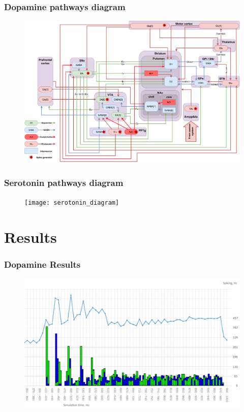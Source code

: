 \documentclass[12pt, aspectratio=169]{beamer}
\begin{document}

\begin{frame}
\frametitle{Dopamine pathways diagram}
\begin{figure}
\includegraphics[width=0.8\linewidth]{dopamine_diagram}
\end{figure}
\end{frame}


\begin{frame}
\frametitle{Serotonin pathways diagram}
\begin{figure}
\texttt{[image: serotonin\_diagram]}
\end{figure}
\end{frame}

\section{Results}

\begin{frame}
\frametitle{Dopamine Results}
\begin{figure}
\includegraphics[width=0.8\linewidth]{resultBIG_short}
\end{figure}
\end{frame}
\end{document}
